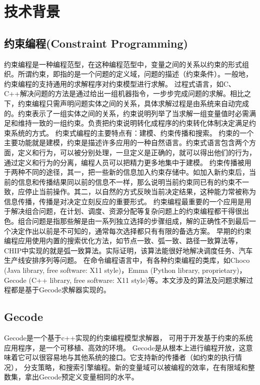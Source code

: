 \documentclass[UTF8，12pt]{ctexart}
\begin{document}
\section{技术背景}
\subsection{约束编程(Constraint Programming)}
约束编程是一种编程范型，在这种编程范型中，变量之间的关系以约束的形式组织。所谓约束，即指的是一个问题的定义域，问题的描述（约束条件）。一般地，约束编程的支持通用的求解程序对约束模型进行求解。
过程式语言，如C、C++解决问题的方法是通过给出一组机器指令，一步步完成问题的求解。相比之下，约束编程只需声明问题实体之间的关系，具体求解过程是由系统来自动完成的。约束表示了一组实体之间的关系，约束说明列举了当求解一组变量值时必需满足和维持一致的一组约束。负责把约束说明转化成程序的约束转化体制决定满足约束系统的方式。
约束式编程的主要特点有：建模、约束传播和搜索。
约束的一个主要功能就是建模，约束是描述许多应用的一种自然语言。约束式语言包含两个方面，定义和行为，可以被分别处理，一旦定义是正确的，就可以得出他们的行为，通过定义和行为的分离，编程人员可以把精力更多地集中于建模。 
 约束传播被用于两种不同的途径，其一，把一些新的信息加入约束存储中。如加入新约束后，当前的信息和传播结果同以前的信息不一样，那么说明当前约束同已有的约束不一致，应停止当前操作。其二，以自然的方式反映当前决定结果，这种能力常被称为信息传播，传播是对决定立刻反应的重要形式。
约束编程最重要的一个应用是用于解决组合问题，在计划、调度、资源分配等复杂问题上的约束编程都干得很出色。组合问题是指那些解是由一系列独立选择的步骤组成，解的正确性不到最后一个决定作出以前是不可知的，通常每次选择都只有有限的备选方案。
 早期的约束编程应用使用内置的搜索优化方法，如节点一致、弧一致、路径一致算法等，CHIP中实现的就是弧一致算法。实际证明，该算法能很好地解决调度任务、汽车生产线安排序列等问题。
在命令编程语言中，有各种约束编程的类库，如Choco (Java library, free software: X11 style)，Emma (Python library, proprietary)，Gecode (C++ library, free software: X11 style)等。本文涉及的算法及问题求解过程都是基于Gecode求解器实现的。
\subsection{Gecode}
Gecode\cite{gecode}是一个基于c++实现的约束编程模型求解器，
可用于开发基于约束的系统应用程序，是一个可移植、高效的环境。 Gecode是从根本上进行编程开放，这意味着它可以很容易地与其他系统的接口。它支持新的传播者（如约束的执行情况），
分支策略，和搜索引擎编程。新的变量域可以被编程的效率，在有限域和整数集，拿出Gecode预定义变量相同的水平。
\end{document}
